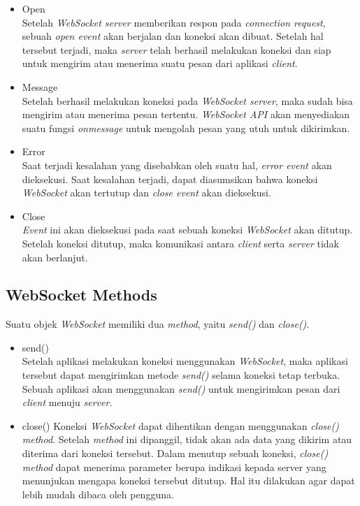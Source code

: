 	\begin{itemize}
		\item Open \\
		Setelah \textit{WebSocket server} memberikan respon pada \textit{connection request}, sebuah \textit{open event} akan berjalan dan koneksi akan dibuat. Setelah hal tersebut terjadi, maka \textit{server} telah berhasil melakukan koneksi dan siap untuk mengirim atau menerima suatu pesan dari aplikasi \textit{client}.
		\item Message \\
		Setelah berhasil melakukan koneksi pada \textit{WebSocket server}, maka sudah bisa mengirim atau menerima pesan tertentu. \textit{WebSocket API} akan menyediakan suatu fungsi \textit{onmessage} untuk mengolah pesan yang utuh untuk dikirimkan.
		\item Error \\
		Saat terjadi kesalahan yang disebabkan oleh suatu hal, \textit{error event} akan dieksekusi. Saat kesalahan terjadi, dapat diasumsikan bahwa koneksi \textit{WebSocket} akan tertutup dan \textit{close event} akan dieksekusi.
		\item Close \\
		\textit{Event} ini akan dieksekusi pada saat sebuah koneksi \textit{WebSocket} akan ditutup. Setelah koneksi ditutup, maka komunikasi antara \textit{client} serta \textit{server} tidak akan berlanjut.
	\end{itemize}

\subsection{WebSocket Methods}
Suatu objek \textit{WebSocket} memiliki dua \textit{method}, yaitu \textit{send()} dan \textit{close()}.

\begin{itemize}
	\item send() \\
	Setelah aplikasi melakukan koneksi menggunakan \textit{WebSocket}, maka aplikasi tersebut dapat mengirimkan metode \textit{send()} selama koneksi tetap terbuka. Sebuah aplikasi akan menggunakan \textit{send()} untuk mengirimkan pesan dari \textit{client} menuju \textit{server}. 
	
	\item close()
	Koneksi \textit{WebSocket} dapat dihentikan dengan menggunakan \textit{close() method}. Setelah \textit{method} ini dipanggil, tidak akan ada data yang dikirim atau diterima dari koneksi tersebut. Dalam menutup sebuah koneksi, \textit{close() method} dapat menerima parameter berupa indikasi kepada server yang menunjukan mengapa koneksi tersebut ditutup. Hal itu dilakukan agar dapat lebih mudah dibaca oleh pengguna.
	
\end{itemize}

